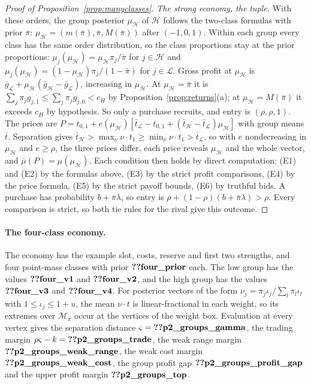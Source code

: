 \begin{proof}[Proof of Proposition~\ref{prop:manyclasses}]
\emph{The strong economy, the tuple.} With these orders, the group posterior \(\mu_{\mathcal H}\) of \(\mathcal H\) follows the
two-class formulas with prior \(\bar\pi\): \(\mu_{\mathcal H}=(m(\bar\pi),\bar\pi,M(\bar\pi))\) after \((-1,0,1)\). Within each
group every class has the same order distribution, so the class proportions stay at the prior proportions:
\(\mu_j(\mu_{\mathcal H})=\mu_{\mathcal H}\pi_j/\bar\pi\) for \(j\in\mathcal H\) and \(\mu_j(\mu_{\mathcal H})=(1-\mu_{\mathcal H})\pi_j/(1-\bar\pi)\) for \(j\in\mathcal L\). Gross
profit at \(\mu_{\mathcal H}\) is \(\bar g_{\mathcal L}+\mu_{\mathcal H}(\bar g_{\mathcal H}-\bar g_{\mathcal L})\), increasing in \(\mu_{\mathcal H}\). At
\(\mu_{\mathcal H}=\bar\pi\) it is \(\sum_j\pi_jg_{j,1}\le\sum_j\pi_jg_{j,0}<c_H\) by Proposition~\ref{prop:returns}(a); at
\(\mu_{\mathcal H}=M(\bar\pi)\) it exceeds \(c_H\) by hypothesis. So only a purchase recruits, and entry is \((\rho,\rho,1)\). The
prices are \(P=t_{0,1}+e(\mu_{\mathcal H})[\bar t_{\mathcal L}-t_{0,1}+(\bar t_{\mathcal H}-\bar t_{\mathcal L})\mu_{\mathcal H}]\) with group means
\(\bar t\). Separation gives \(\bar t_{\mathcal H}>\max_{\nu}\nu\cdot t_1\ge\min_\nu\nu\cdot t_1>\bar t_{\mathcal L}\),
so with \(e\) nondecreasing in \(\mu_{\mathcal H}\) and \(e\ge\rho\), the three prices differ, each price reveals \(\mu_{\mathcal H}\) and the whole
vector, and \(\bar\mu(P)=\mu(\mu_{\mathcal H})\). Each condition then holds by direct computation: (E1) and (E2) by the formulas
above, (E3) by the strict profit comparisons, (E4) by the price formula, (E5) by the strict payoff bounds, (E6) by
truthful bids. A purchase has probability \(b+\bar\pi\lambda\), so entry is \(\rho+(1-\rho)(b+\bar\pi\lambda)>\rho\).
Every comparison is strict, so both tie rules for the rival give this outcome.
\end{proof}

\paragraph{The four-class economy.}
The economy has the example slot, costs, reserve and first two strengths, and four point-mass classes with prior
\(\reg{four_prior}\) each. The low group has the values \(\reg{four_v1}\) and \(\reg{four_v2}\), and the high group has
the values \(\reg{four_v3}\) and \(\reg{four_v4}\).
For posterior vectors of the form \(\nu_j=\pi_j\iota_j/\sum_l\pi_l\iota_l\) with \(1\le \iota_j\le1+u\), the mean \(\nu\cdot t\) is
linear-fractional in each weight, so its extremes over \(\mathcal M_\pi\) occur at the vertices of the weight box.
Evaluation at every vertex gives the separation distance \(\varsigma=\reg{p2_groups_gamma}\), the trading margin
\(\rho\varsigma-k=\reg{p2_groups_trade}\), the weak range margin \(\reg{p2_groups_weak_range}\), the weak cost margin
\(\reg{p2_groups_weak_cost}\), the group profit gap \(\reg{p2_groups_profit_gap}\) and the upper profit margin
\(\reg{p2_groups_top}\).

